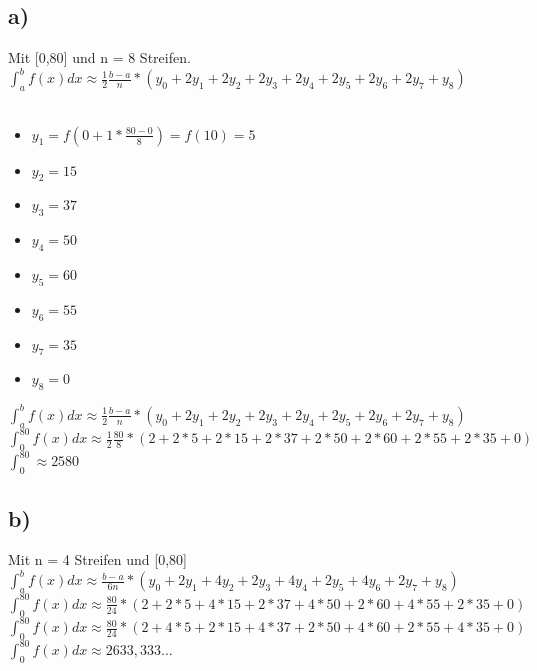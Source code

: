 \documentclass{article}
\begin{document}
	\subsection*{a)}
	Mit [0,80] und n = 8 Streifen. \\
	$\int_{a}^{b} f(x) dx \approx \frac{1}{2} \frac{b-a}{n} * (y_0 + 2y_1 + 2y_2 + 2y_3 + 2y_4 + 2y_5 + 2y_6 + 2y_7 + y_8)$ \\ \\
	\begin{itemize}
		\item $y_1 = f(0 + 1*\frac{80-0}{8}) = f(10) = 5$
		\item $y_2 = 15$
		\item $y_3 = 37$
		\item $y_4 = 50$
		\item $y_5 = 60$
		\item $y_6 = 55$
		\item $y_7 = 35$
		\item $y_8 = 0$
	\end{itemize}
	$\int_{a}^{b} f(x) dx \approx \frac{1}{2} \frac{b-a}{n} * (y_0 + 2y_1 + 2y_2 + 2y_3 + 2y_4 + 2y_5 + 2y_6 + 2y_7 + y_8)$ \\
	$\int_{0}^{80} f(x) dx \approx \frac{1}{2} \frac{80}{8} * (2 + 2*5 + 2*15 + 2*37 + 2*50 + 2*60 + 2*55 + 2*35 + 0)$ \\
	$\int_{0}^{80} \approx 2580$
	\subsection*{b)}
	Mit n = 4 Streifen und [0,80] \\
	$\int_{a}^{b} f(x) dx \approx \frac{b-a}{6n} * (y_0 + 2y_1 + 4y_2 + 2y_3 + 4y_4 + 2y_5 + 4y_6 + 2y_7 + y_8)$ \\
	$\int_{0}^{80} f(x) dx \approx \frac{80}{24} * (2 + 2*5 + 4*15 + 2*37 + 4*50 + 2*60 + 4*55 + 2*35 + 0)$ \\
	$\int_{0}^{80} f(x) dx \approx \frac{80}{24} * (2 + 4*5 + 2*15 + 4*37 + 2*50 + 4*60 + 2*55 + 4*35 + 0)$ \\
	$\int_{0}^{80} f(x) dx \approx 2633,333...$
\end{document}
